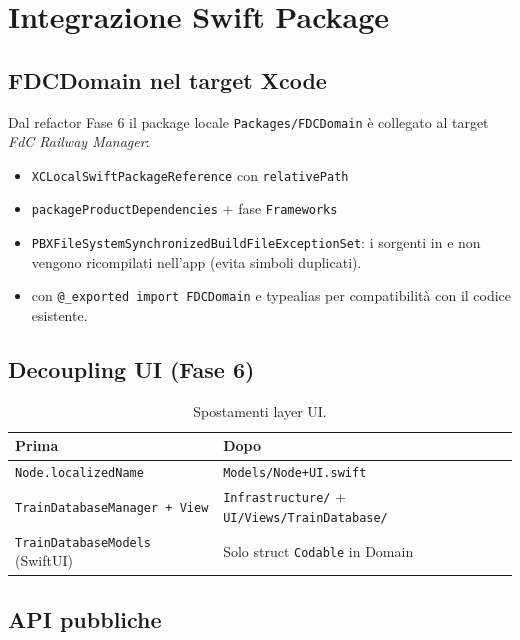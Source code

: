 \chapter{Integrazione Swift Package}
\label{ch:spm}

\section{FDCDomain nel target Xcode}

Dal refactor Fase 6 il package locale \texttt{Packages/FDCDomain}
è collegato al target \emph{FdC Railway Manager}:

\begin{itemize}
  \item \texttt{XCLocalSwiftPackageReference} con \texttt{relativePath}
  \item \texttt{packageProductDependencies} + fase \texttt{Frameworks}
  \item \texttt{PBXFileSystemSynchronizedBuildFileExceptionSet}: i sorgenti
    in  e  non vengono
    ricompilati nell'app (evita simboli duplicati).
  \item {} con \texttt{@\_exported import FDCDomain}
    e typealias per compatibilità con il codice esistente.
\end{itemize}

\section{Decoupling UI (Fase 6)}

\begin{table}[htbp]
\centering
\caption{Spostamenti layer UI.}
\begin{tabularx}{\textwidth}{lX}
  \toprule
  \textbf{Prima} & \textbf{Dopo} \\
  \midrule
  \texttt{Node.localizedName} & \texttt{Models/Node+UI.swift} \\
  \texttt{TrainDatabaseManager + View} & \texttt{Infrastructure/} + \texttt{UI/Views/TrainDatabase/} \\
  \texttt{TrainDatabaseModels} (SwiftUI) & Solo struct \texttt{Codable} in Domain \\
  \bottomrule
\end{tabularx}
\end{table}

\section{API pubbliche}

